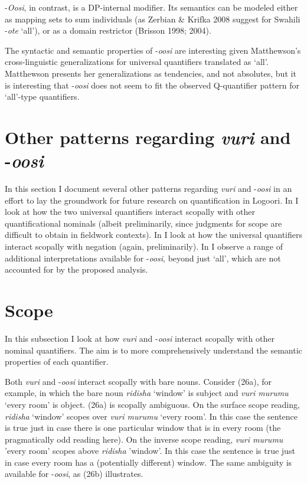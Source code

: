 \documentclass[output=paper]{langsci/langscibook}
\begin{document}
  {}-\textit{Oosi}, in contrast, is a DP-internal modifier. Its semantics can be modeled either as mapping sets to sum individuals (as Zerbian \& Krifka 2008 suggest for Swahili -\textit{ote} ‘all’), or as a domain restrictor (Brisson 1998; 2004). 

  The syntactic and semantic properties of -\textit{oosi} are interesting given Matthewson's cross-linguistic generalizations for universal quantifiers translated as ‘all’. Matthewson presents her generalizations as tendencies, and not absolutes, but it is interesting that -\textit{oosi} does not seem to fit the observed Q-quantifier pattern for ‘all’-type quantifiers. 

\section{Other patterns regarding \textit{vuri} and -\textit{oosi}}

  In this section I document several other patterns regarding \textit{vuri} and -\textit{oosi} in an effort to lay the groundwork for future research on quantification in Logoori. In  I look at how the two universal quantifiers interact scopally with other quantificational nominals (albeit preliminarily, since judgments for scope are difficult to obtain in fieldwork contexts). In  I look at how the universal quantifiers interact scopally with negation (again, preliminarily). In  I observe a range of additional interpretations available for -\textit{oosi}, beyond just ‘all’, which are not accounted for by the proposed analysis.

\section{Scope} 

  In this subsection I look at how \textit{vuri} and -\textit{oosi} interact scopally with other nominal quantifiers. The aim is to more comprehensively understand the semantic properties of each quantifier.

  Both \textit{vuri} and -\textit{oosi} interact scopally with bare nouns. Consider (26a), for example, in which the bare noun \textit{ridisha} ‘window’ is subject and \textit{vuri murumu} ‘every room’ is object. (26a) is scopally ambiguous. On the surface scope reading, \textit{ridisha} ‘window’ scopes over \textit{vuri murumu} ‘every room’. In this case the sentence is true just in case there is one particular window that is in every room (the pragmatically odd reading here). On the inverse scope reading, \textit{vuri murumu} 'every room' scopes above \textit{ridisha} 'window'. In this case the sentence is true just in case every room has a (potentially different) window. The same ambiguity is available for -\textit{oosi}, as (26b) illustrates.
\end{document}
